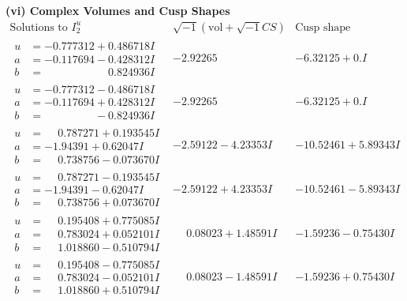 \documentclass[1p]{elsarticle_modified}
\theoremstyle{definition}
\newcommand{\I}{\sqrt{-1}}
\begin{document}
\newpage\flushleft \textbf{(vi) Complex Volumes and Cusp Shapes}
$$\begin{array}{c|c|c}  
\text{Solutions to }I^u_{2}& \I (\text{vol} + \sqrt{-1}CS) & \text{Cusp shape}\\
 \hline 
\begin{aligned}
u &= -0.777312 + 0.486718 I \\
a &= -0.117694 - 0.428312 I \\
b &= \phantom{-0.000000 -}0.824936 I\end{aligned}
 & -2.92265\phantom{ +0.000000I} & -6.32125 + 0. I\phantom{ +0.000000I} \\ \hline\begin{aligned}
u &= -0.777312 - 0.486718 I \\
a &= -0.117694 + 0.428312 I \\
b &= \phantom{-0.000000 } -0.824936 I\end{aligned}
 & -2.92265\phantom{ +0.000000I} & -6.32125 + 0. I\phantom{ +0.000000I} \\ \hline\begin{aligned}
u &= \phantom{-}0.787271 + 0.193545 I \\
a &= -1.94391 + 0.62047 I \\
b &= \phantom{-}0.738756 - 0.073670 I\end{aligned}
 & -2.59122 - 4.23353 I & -10.52461 + 5.89343 I \\ \hline\begin{aligned}
u &= \phantom{-}0.787271 - 0.193545 I \\
a &= -1.94391 - 0.62047 I \\
b &= \phantom{-}0.738756 + 0.073670 I\end{aligned}
 & -2.59122 + 4.23353 I & -10.52461 - 5.89343 I \\ \hline\begin{aligned}
u &= \phantom{-}0.195408 + 0.775085 I \\
a &= \phantom{-}0.783024 + 0.052101 I \\
b &= \phantom{-}1.018860 - 0.510794 I\end{aligned}
 & \phantom{-}0.08023 + 1.48591 I & -1.59236 - 0.75430 I \\ \hline\begin{aligned}
u &= \phantom{-}0.195408 - 0.775085 I \\
a &= \phantom{-}0.783024 - 0.052101 I \\
b &= \phantom{-}1.018860 + 0.510794 I\end{aligned}
 & \phantom{-}0.08023 - 1.48591 I & -1.59236 + 0.75430 I \\ \hline\begin{aligned}

\end{aligned}
\end{array}$$
\end{document}
